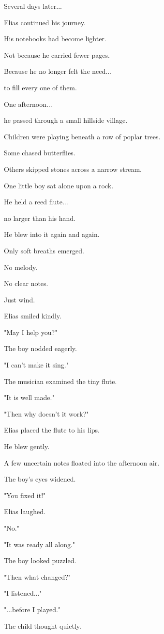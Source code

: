 \documentclass[12pt,openany]{book}
\begin{document}
Several days later...

Elias continued his journey.

His notebooks had become lighter.

Not because he carried fewer pages.

Because he no longer felt the need...

to fill every one of them.

One afternoon...

he passed through a small hillside village.

Children were playing beneath a row of poplar trees.

Some chased butterflies.

Others skipped stones across a narrow stream.

One little boy sat alone upon a rock.

He held a reed flute...

no larger than his hand.

He blew into it again and again.

Only soft breaths emerged.

No melody.

No clear notes.

Just wind.

Elias smiled kindly.

"May I help you?"

The boy nodded eagerly.

"I can't make it sing."

The musician examined the tiny flute.

"It is well made."

"Then why doesn't it work?"

Elias placed the flute to his lips.

He blew gently.

A few uncertain notes floated into the afternoon air.

The boy's eyes widened.

"You fixed it!"

Elias laughed.

"No."

"It was ready all along."

The boy looked puzzled.

"Then what changed?"

"I listened..."

"...before I played."

The child thought quietly.
\end{document}
